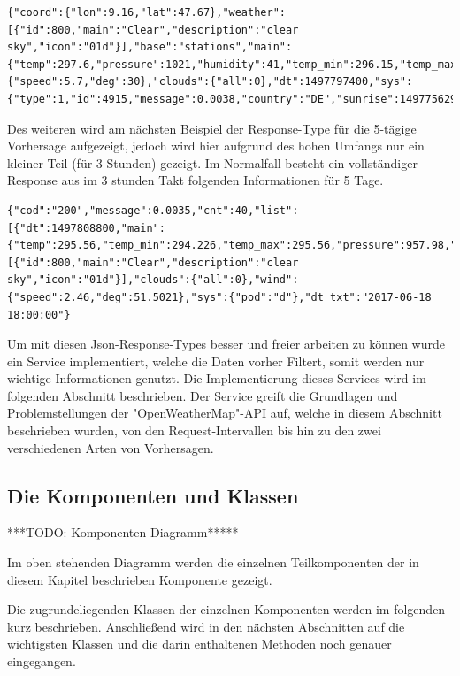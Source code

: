   \begin{lstlisting}
{"coord":{"lon":9.16,"lat":47.67},"weather":[{"id":800,"main":"Clear","description":"clear sky","icon":"01d"}],"base":"stations","main":{"temp":297.6,"pressure":1021,"humidity":41,"temp_min":296.15,"temp_max":298.15},"visibility":10000,"wind":{"speed":5.7,"deg":30},"clouds":{"all":0},"dt":1497797400,"sys":{"type":1,"id":4915,"message":0.0038,"country":"DE","sunrise":1497756293,"sunset":1497813872},"id":0,"name":"Konstanz","cod":200}
\end{lstlisting}

Des weiteren wird am nächsten Beispiel der Response-Type für die 5-tägige Vorhersage aufgezeigt, jedoch wird hier aufgrund des hohen Umfangs nur ein kleiner Teil (für 3 Stunden) gezeigt. Im Normalfall besteht ein vollständiger Response aus im 3 stunden Takt 
folgenden Informationen für 5 Tage.
 
  \begin{lstlisting}
{"cod":"200","message":0.0035,"cnt":40,"list":[{"dt":1497808800,"main":{"temp":295.56,"temp_min":294.226,"temp_max":295.56,"pressure":957.98,"sea_level":1034.02,"grnd_level":957.98,"humidity":53,"temp_kf":1.34},"weather":[{"id":800,"main":"Clear","description":"clear sky","icon":"01d"}],"clouds":{"all":0},"wind":{"speed":2.46,"deg":51.5021},"sys":{"pod":"d"},"dt_txt":"2017-06-18 18:00:00"}
\end{lstlisting}
\clearpage
Um mit diesen Json-Response-Types besser und freier arbeiten zu können wurde ein Service implementiert, welche die Daten vorher Filtert, somit werden nur wichtige Informationen genutzt. Die Implementierung dieses Services wird im folgenden Abschnitt beschrieben. Der Service greift die Grundlagen und Problemstellungen der "OpenWeatherMap"-API auf, welche in diesem Abschnitt beschrieben wurden, von den Request-Intervallen bis hin zu den zwei verschiedenen Arten von Vorhersagen.

\subsection{Die Komponenten und Klassen}

***TODO: Komponenten Diagramm*****

Im oben stehenden Diagramm werden die einzelnen Teilkomponenten der in diesem Kapitel beschrieben Komponente gezeigt. 

Die zugrundeliegenden Klassen der einzelnen Komponenten werden im folgenden kurz beschrieben. Anschließend wird in den nächsten Abschnitten auf die wichtigsten Klassen und die darin enthaltenen Methoden noch genauer eingegangen. 

